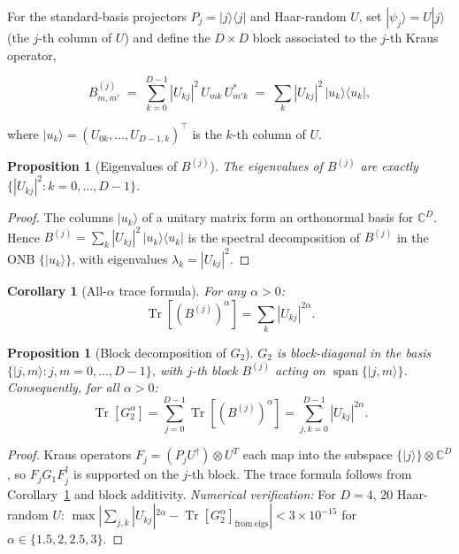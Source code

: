 \documentclass[12pt,a4paper]{article}
\newtheorem{proposition}[theorem]{Proposition}
\newtheorem{corollary}[theorem]{Corollary}
\begin{document}
For the standard-basis projectors $P_j=|j\rangle\langle j|$ and Haar-random $U$,
set $|\psi_j\rangle=U|j\rangle$ (the $j$-th column of $U$) and define the $D\times D$
block associated to the $j$-th Kraus operator,

\begin{equation}
  B^{(j)}_{m,m'}
  \;=\; \sum_{k=0}^{D-1}|U_{kj}|^2\,U_{mk}\,U^*_{m'k}
  \;=\; \sum_k |U_{kj}|^2\,|u_k\rangle\langle u_k|,
  \label{eq:Bjblock}
\end{equation}

where $|u_k\rangle=(U_{0k},\ldots,U_{D-1,k})^\top$ is the $k$-th column of $U$.

\begin{proposition}[Eigenvalues of $B^{(j)}$]
\label{prop:Bj_eigs}
The eigenvalues of $B^{(j)}$ are exactly $\{|U_{kj}|^2:k=0,\ldots,D-1\}$.
\end{proposition}

\begin{proof}
The columns $|u_k\rangle$ of a unitary matrix form an orthonormal basis for $\mathbb{C}^D$.
Hence $B^{(j)}=\sum_k|U_{kj}|^2\,|u_k\rangle\langle u_k|$ is the spectral decomposition of $B^{(j)}$
in the ONB $\{|u_k\rangle\}$, with eigenvalues $\lambda_k=|U_{kj}|^2$.
\end{proof}

\begin{corollary}[All-$\alpha$ trace formula]
\label{cor:bj_trace_alpha}
For any $\alpha>0$:
\[
  \operatorname{Tr}[(B^{(j)})^\alpha]=\sum_k |U_{kj}|^{2\alpha}.
\]
\end{corollary}

\begin{proposition}[Block decomposition of $G_2$]
\label{prop:g2_block}
$G_2$ is block-diagonal in the basis $\{|j,m\rangle:j,m=0,\ldots,D-1\}$,
with $j$-th block $B^{(j)}$ acting on $\operatorname{span}\{|j,m\rangle\}$.
Consequently, for all $\alpha>0$:
\[
  \operatorname{Tr}[G_2^\alpha] = \sum_{j=0}^{D-1}\operatorname{Tr}[(B^{(j)})^\alpha]
  = \sum_{j,k=0}^{D-1}|U_{kj}|^{2\alpha}.
  \label{eq:TrG2alpha}
\]
\end{proposition}

\begin{proof}
Kraus operators $F_j=(P_jU^\dagger)\otimes U^T$ each map into the subspace
$\{|j\rangle\}\otimes\mathbb{C}^D$, so $F_jG_1F_j^\dagger$ is supported on the $j$-th block.
The trace formula follows from Corollary~\ref{cor:bj_trace_alpha} and block additivity.
\emph{Numerical verification:} For $D=4$, 20 Haar-random $U$:
$\max|\sum_{j,k}|U_{kj}|^{2\alpha}-\operatorname{Tr}[G_2^\alpha]_{\mathrm{from\ eigs}}|<3\times10^{-15}$
for $\alpha\in\{1.5,2,2.5,3\}$.
\end{proof}
\end{document}
